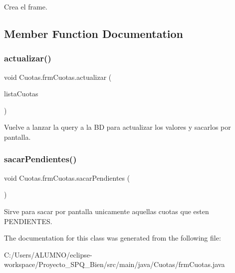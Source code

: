 Crea el frame. 

\subsection{Member Function Documentation}
\mbox{\label{class_cuotas_1_1frm_cuotas_ad7151dc2288e0444968ac6ea359ceac5}} 
\subsubsection{\texorpdfstring{actualizar()}{actualizar()}}
{\footnotesize\ttfamily void Cuotas.\+frm\+Cuotas.\+actualizar (\begin{DoxyParamCaption}\item[{Array\+List$<$ \hyperlink{class_cuotas_1_1_cuota}{Cuota} $>$}]{lista\+Cuotas }\end{DoxyParamCaption})}

Vuelve a lanzar la query a la BD para actualizar los valores y sacarlos por pantalla. \mbox{\label{class_cuotas_1_1frm_cuotas_ab5b5e9c75b186b55c01cb2bd783efad3}} 
\subsubsection{\texorpdfstring{sacar\+Pendientes()}{sacarPendientes()}}
{\footnotesize\ttfamily void Cuotas.\+frm\+Cuotas.\+sacar\+Pendientes (\begin{DoxyParamCaption}{ }\end{DoxyParamCaption})}

Sirve para sacar por pantalla unicamente aquellas cuotas que esten P\+E\+N\+D\+I\+E\+N\+T\+ES. 

The documentation for this class was generated from the following file\+:\begin{DoxyCompactItemize}
\item 
C\+:/\+Users/\+A\+L\+U\+M\+N\+O/eclipse-\/workspace/\+Proyecto\+\_\+\+S\+P\+Q\+\_\+Bien/src/main/java/\+Cuotas/frm\+Cuotas.\+java\end{DoxyCompactItemize}
